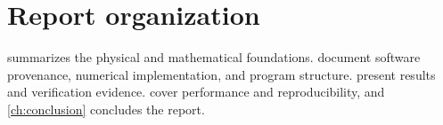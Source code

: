 \section{Report organization}

 summarizes the physical and mathematical foundations.
 document software
provenance, numerical implementation, and program structure.
 present results and verification evidence.
 cover performance and reproducibility, and
\cref{ch:conclusion} concludes the report.
